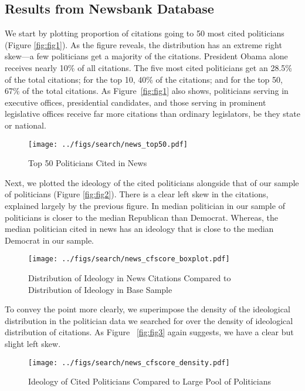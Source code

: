 \documentclass[12pt, letterpaper]{article}
\begin{document}
\subsection{Results from Newsbank Database}
\label{cc_transcript_res}
\normalsize
We start by plotting proportion of citations going to 50 most cited politicians (Figure \ref{fig:fig1}). As the figure reveals, the distribution has an extreme right skew---a few politicians get a majority of the citations. President Obama alone receives nearly 10\% of all citations. The five most cited politicians get an 28.5\% of the total citations; for the top 10, 40\% of the citations; and for the top 50, 67\% of the total citations. As Figure~\ref{fig:fig1} also shows, politicians serving in executive offices, presidential candidates, and those serving in prominent legislative offices receive far more citations than ordinary legislators, be they state or national.

\begin{figure}[h]
  \centering
  \caption{Top 50 Politicians Cited in News}
  \texttt{[image: ../figs/search/news\_top50.pdf]}
  \label{fig:top50_newsbank}
\end{figure}

Next, we plotted the ideology of the cited politicians alongside that of our sample of politicians (Figure \ref{fig:fig2}). There is a clear left skew in the citations, explained largely by the previous figure. In median politician in our sample of politicians is closer to the median Republican than Democrat. Whereas, the median politician cited in news has an ideology that is close to the median Democrat in our sample.

\begin{figure}[h]
  \centering
  \caption{Distribution of Ideology in News Citations Compared to Distribution of Ideology in Base Sample}
  \texttt{[image: ../figs/search/news\_cfscore\_boxplot.pdf]}
  \label{fig:cfscore_box_newsbank}
\end{figure}

To convey the point more clearly, we superimpose the density of the ideological distribution in the politician data we searched for over the density of ideological distribution of citations. As Figure ~\ref{fig:fig3} again suggests, we have a clear but slight left skew.

\begin{figure}[h]
  \centering
  \caption{Ideology of Cited Politicians Compared to Large Pool of Politicians}
  \texttt{[image: ../figs/search/news\_cfscore\_density.pdf]}
  \label{fig:cfscore_density_newsbank}
\end{figure}
\end{document}
